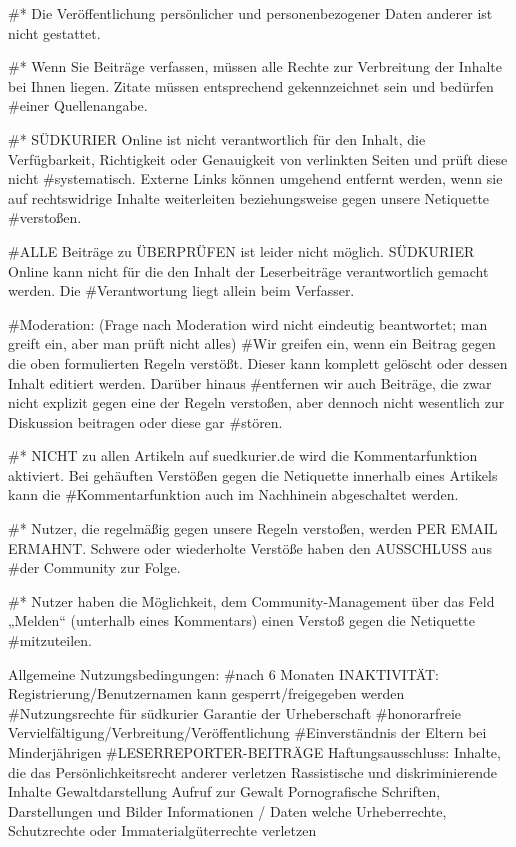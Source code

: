 #* Die Veröffentlichung persönlicher und personenbezogener Daten anderer ist nicht gestattet.

#* Wenn Sie Beiträge verfassen, müssen alle Rechte zur Verbreitung der Inhalte bei Ihnen liegen. Zitate müssen entsprechend gekennzeichnet sein und bedürfen #einer Quellenangabe.

#* SÜDKURIER Online ist nicht verantwortlich für den Inhalt, die Verfügbarkeit, Richtigkeit oder Genauigkeit von verlinkten Seiten und prüft diese nicht #systematisch. Externe Links können umgehend entfernt werden, wenn sie auf rechtswidrige Inhalte weiterleiten beziehungsweise gegen unsere Netiquette #verstoßen.

#ALLE Beiträge zu ÜBERPRÜFEN ist leider nicht möglich. SÜDKURIER Online kann nicht für die den Inhalt der Leserbeiträge verantwortlich gemacht werden. Die #Verantwortung liegt allein beim Verfasser.

#Moderation: (Frage nach Moderation wird nicht eindeutig beantwortet; man greift ein, aber man prüft nicht alles)
#Wir greifen ein, wenn ein Beitrag gegen die oben formulierten Regeln verstößt. Dieser kann komplett gelöscht oder dessen Inhalt editiert werden. Darüber hinaus #entfernen wir auch Beiträge, die zwar nicht explizit gegen eine der Regeln verstoßen, aber dennoch nicht wesentlich zur Diskussion beitragen oder diese gar #stören.

#* NICHT zu allen Artikeln auf suedkurier.de wird die Kommentarfunktion aktiviert. Bei gehäuften Verstößen gegen die Netiquette innerhalb eines Artikels kann die #Kommentarfunktion auch im Nachhinein abgeschaltet werden.

#* Nutzer, die regelmäßig gegen unsere Regeln verstoßen, werden PER EMAIL ERMAHNT. Schwere oder wiederholte Verstöße haben den AUSSCHLUSS aus #der Community zur Folge.

#* Nutzer haben die Möglichkeit, dem Community-Management über das Feld „Melden“ (unterhalb eines Kommentars) einen Verstoß gegen die Netiquette #mitzuteilen.


Allgemeine Nutzungsbedingungen:
#nach 6 Monaten INAKTIVITÄT: Registrierung/Benutzernamen kann gesperrt/freigegeben werden
#Nutzungsrechte für südkurier
Garantie der Urheberschaft
#honorarfreie Vervielfältigung/Verbreitung/Veröffentlichung
#Einverständnis der Eltern bei Minderjährigen
#LESERREPORTER-BEITRÄGE
Haftungsausschluss: 
    Inhalte, die das Persönlichkeitsrecht anderer verletzen
    Rassistische und diskriminierende Inhalte
    Gewaltdarstellung
    Aufruf zur Gewalt
    Pornografische Schriften, Darstellungen und Bilder
    Informationen / Daten welche Urheberrechte, Schutzrechte oder Immaterialgüterrechte verletzen

